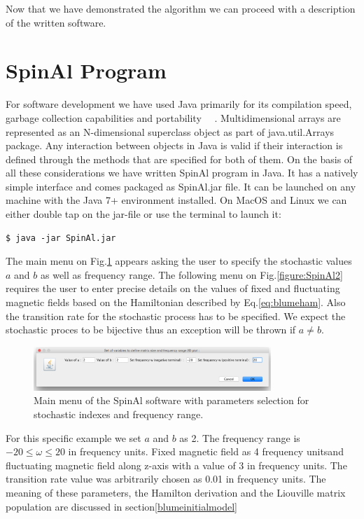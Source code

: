 Now that we have demonstrated the algorithm we can proceed with a description of the written software.
\section{SpinAl Program}
For software development we have used Java primarily for its compilation speed, garbage collection capabilities and portability ~\cite{hortell}~\cite{javapal}. Multidimensional arrays are represented as an N-dimensional superclass object as part of java.util.Arrays package. Any interaction between objects in Java is valid if their interaction is defined through the methods that are specified for both of them. On the basis of all these considerations we have written SpinAl program in Java. It has a natively simple interface and comes packaged as SpinAl.jar file. It can be launched on any machine with the Java 7+ environment installed. On MacOS and Linux we can either double tap on the jar-file or use the terminal to launch it:
\begin{lstlisting}
$ java -jar SpinAl.jar
\end{lstlisting}
The main menu on Fig.\ref{figure:SpinAl1} appears asking the user to specify the stochastic values $a$ and $b$ as well as frequency range. The following menu on Fig.\ref{figure:SpinAl2} requires the user to enter precise details on the values of fixed and fluctuating magnetic fields based on the Hamiltonian described by Eq.\eqref{eq:blumeham}. Also the transition rate for the stochastic process has to be specified. We expect the stochastic proces to be bijective thus an exception will be thrown if $a\neq b$. 
\begin{figure}[h!]
\centering
\includegraphics[width=0.8\textwidth]{figures/chap2/spinal1.png}
\caption{Main menu of the SpinAl software with parameters selection for stochastic indexes and frequency range.}
\label{figure:SpinAl1}
\end{figure}
For this specific example we set $a$ and $b$ as 2. The frequency range is $-20\leq\omega\leq 20$ in frequency units. Fixed magnetic field as 4 frequency unitsand fluctuating magnetic field along z-axis with a value of 3 in frequency units. The transition rate value was arbitrarily chosen as 0.01 in frequency units. The meaning of these parameters, the Hamilton derivation and the Liouville matrix population are discussed in section\ref{blumeinitialmodel} 
